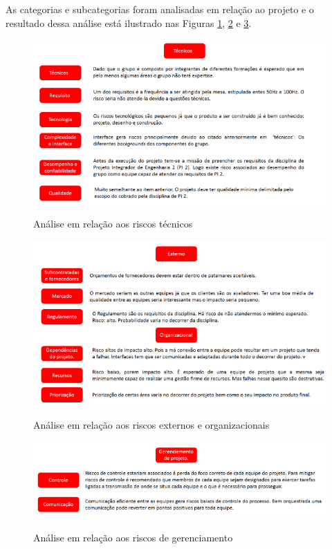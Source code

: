 As categorias e subcategorias foram analisadas em relação ao projeto e o resultado dessa análise está ilustrado nas Figuras \ref{fig:riscos_tecnicos}, \ref{fig:riscos_externos} e \ref{fig:riscos_gerenciamento}.

  \begin{figure}[h]
    \begin{center}
    \label{fig:riscos_tecnicos}
    \includegraphics[scale=0.65]{figuras/riscos_tecnicos.png}
    \end{center}
    \caption{Análise em relação aos riscos técnicos}
  \end{figure}

  \begin{figure}[h]
    \begin{center}
    \label{fig:riscos_externos}
    \includegraphics[scale=0.65]{figuras/riscos_externos_organizacional.png}
    \end{center}
    \caption{Análise em relação aos riscos externos e organizacionais}
  \end{figure}

  \begin{figure}[ht]
    \begin{center}
    \label{fig:riscos_gerenciamento}
    \includegraphics[scale=0.65]{figuras/riscos_gerenciamento.png}
    \end{center}
    \caption{Análise em relação aos riscos de gerenciamento}
  \end{figure}

